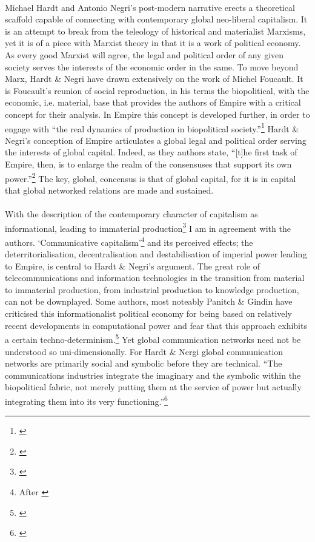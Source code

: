 \documentclass[12pt,a4paper,titlepage]{article}
\begin{document}
\paragraph{}Michael Hardt and Antonio Negri's post-modern narrative erects a theoretical scaffold capable of connecting with contemporary global neo-liberal capitalism. It is an attempt to break from the teleology of historical and materialist Marxisms, yet it is of a piece with Marxist theory in that it is a work of political economy. As every good Marxist will agree, the legal and political order of any given society serves the interests of the economic order in the same. To move beyond Marx, Hardt \& Negri have drawn extensively on the work of Michel Foucault. It is Foucault's reunion of social reproduction, in his terms the biopolitical, with the economic, i.e. material, base that provides the authors of Empire with a critical concept for their analysis. In Empire this concept is developed further, in order to engage with ``the real dynamics of production in biopolitical society.''\footnote{\cite[p. 28]{Hardt:2001jl}} Hardt \& Negri's conception of Empire articulates a global legal and political order serving the interests of global capital. Indeed, as they authors state, ``[t]he first task of Empire, then, is to enlarge the realm of the consensuses that support its own power.''\footnote{\cite[p. 15]{Hardt:2001jl}} The key, global, concensus is that of global capital, for it is in capital that global networked relations are made and sustained.

\paragraph{}With the description of the contemporary character of capitalism as informational, leading to immaterial production\footnote{\cite[p. 289-300]{Hardt:2001jl}} I am in agreement with the authors. `Communicative capitalism'\footnote{After \cite{dean:2005cc}} and its perceived effects; the deterritorialisation, decentralisation and destabilisation of imperial power leading to Empire, is central to Hardt \& Negri's argument. The great role of telecommunications and information technologies in the transition from material to immaterial production, from industrial production to knowledge production, can not be downplayed. Some authors, most noteably Panitch \& Gindin have criticised this informationalist political economy for being based on relatively recent developments in computational power and fear that this approach exhibits a certain techno-determinism.\footnote{\cite{panitch:2003de}} Yet global communication networks need not be understood so uni-dimensionally. For Hardt \& Nergi global communication networks are primarily social and symbolic before they are technical. ``The communications industries integrate the imaginary and the symbolic within the biopolitical fabric, not merely putting them at the service of power but actually integrating them into its very functioning.''\footnote{\cite[p. 33]{Hardt:2001jl}}
\end{document}
